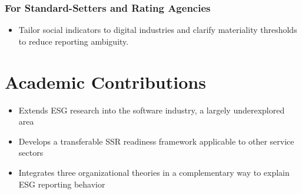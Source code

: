 \subsubsection{For Standard-Setters and Rating Agencies}
\begin{itemize}
    \item Tailor social indicators to digital industries and clarify materiality thresholds to reduce reporting ambiguity.
\end{itemize}

\section{Academic Contributions}
\begin{itemize}
    \item Extends ESG research into the software industry, a largely underexplored area
    \item Develops a transferable SSR readiness framework applicable to other service sectors
    \item Integrates three organizational theories in a complementary way to explain ESG reporting behavior
\end{itemize}